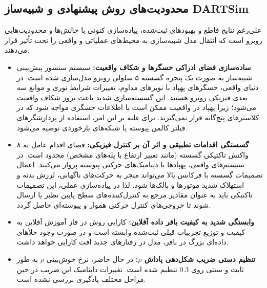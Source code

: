 \documentclass[oneside,openany,a4paper,12pt]{article}
\begin{document}
\subsection{محدودیت‌های روش پیشنهادی و شبیه‌ساز DARTSim}
علی‌رغم نتایج قاطع و بهبودهای ثبت‌شده، پیاده‌سازی کنونی با چالش‌ها و محدودیت‌هایی روبرو است که انتقال مدل شبیه‌سازی به محیط‌های عملیاتی و واقعی  را تحت تأثیر قرار می‌دهند:
\begin{itemize}
    \item \textbf{ساده‌سازی فضای ادراکی حسگرها و شکاف واقعیت:} سیستم سنسور پیش‌بینی شبیه‌ساز به صورت یک پنجره گسسته ۵ سلولی روبرو مدل‌سازی شده است. در دنیای واقعی، حسگرهای پهپاد با نویزهای مداوم، تغییرات شرایط نوری و موانع سه بعدی فیزیکی روبرو هستند. این گسسته‌سازی شدید باعث بروز شکاف واقعیت  می‌شود؛ زیرا پهپاد در واقعیت ممکن است با اطلاعات حسگری مواجه شود که در کلاسترهای پنج‌گانه قرار نمی‌گیرند. برای غلبه بر این امر، استفاده از پردازشگرهای فیلتر کالمن پیوسته یا شبکه‌های بازخوردی توصیه می‌شود.
    \item \textbf{گسستگی اقدامات تطبیقی و اثر آن بر کنترل فیزیکی:} فضای اقدام عامل به ۸ واکنش تاکتیکی گسسته (مانند تغییر ارتفاع با پله‌های مشخص) محدود است. در سیستم‌های واقعی، پهپادها با دینامیک‌های حرکتی پیوسته پرواز می‌کنند. اعمال تصمیمات گسسته با فرکانس بالا می‌تواند منجر به حرکت‌های ناگهانی، لرزش بدنه و استهلاک شدید موتورها و بالک‌ها شود. لذا در پیاده‌سازی عملی، این تصمیمات تاکتیکی باید به عنوان مقادیر مرجع  به کنترل‌کننده‌های سطح پایین نظیر  یا  ارسال شوند تا خروجی‌های کنترل حرکتی هموار و پیوسته‌ای حاصل گردد.
    \item \textbf{وابستگی شدید به کیفیت بافر داده آفلاین:} کارایی روش در فاز آموزش آفلاین به کیفیت و توزیع تجربیات قبلی ثبت‌شده وابسته است و در صورت وجود خلأهای داده‌ای بزرگ در بافر، مدل در رفتارهای جدید افت کارایی خواهد داشت.
    \item \textbf{تنظیم دستی ضریب شکل‌دهی پاداش $\rho$:} در حال حاضر، نرخ خوش‌بینی $\rho$ به طور ثابت و سنتی روی $0.3$ تنظیم شده است. تغییرات داینامیک این ضریب در حین مراحل مختلف یادگیری بررسی نشده است.
\end{itemize}
\end{document}

